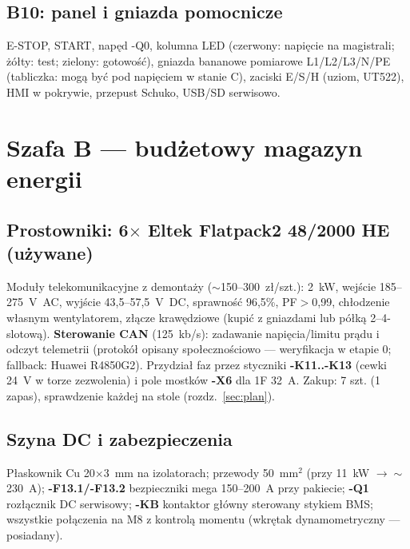 \documentclass[11pt,a4paper]{article}
\begin{document}
\subsection{B10: panel i gniazda pomocnicze}
E-STOP, START, napęd -Q0, kolumna LED (czerwony: napięcie na magistrali; żółty: test; zielony:
gotowość), gniazda bananowe pomiarowe L1/L2/L3/N/PE (tabliczka: mogą być pod napięciem w stanie C),
zaciski E/S/H (uziom, UT522), HMI w pokrywie, przepust Schuko, USB/SD serwisowo.

\section{Szafa B --- budżetowy magazyn energii}
\subsection{Prostowniki: 6$\times$ Eltek Flatpack2 48/2000 HE (używane)}
Moduły telekomunikacyjne z demontaży ($\sim$150--300~zł/szt.): 2~kW, wejście 185--275~V~AC,
wyjście 43,5--57,5~V~DC, sprawność 96,5\%, PF$>$0,99, chłodzenie własnym wentylatorem, złącze
krawędziowe (kupić z gniazdami lub półką 2--4-slotową). \textbf{Sterowanie CAN} (125~kb/s):
zadawanie napięcia/limitu prądu i odczyt telemetrii (protokół opisany społecznościowo ---
weryfikacja w etapie 0; fallback: Huawei R4850G2). Przydział faz przez styczniki \textbf{-K11..-K13}
(cewki 24~V w torze zezwolenia) i pole mostków \textbf{-X6} dla 1F 32~A. Zakup: 7 szt. (1 zapas),
sprawdzenie każdej na stole (rozdz.~\ref{sec:plan}).
\subsection{Szyna DC i zabezpieczenia}
Płaskownik Cu 20$\times$3~mm na izolatorach; przewody 50~mm$^2$ (przy 11~kW $\to\sim$230~A);
\textbf{-F13.1/-F13.2} bezpieczniki mega 150--200~A przy pakiecie; \textbf{-Q1} rozłącznik DC
serwisowy; \textbf{-KB} kontaktor główny sterowany stykiem BMS; wszystkie połączenia na M8
z kontrolą momentu (wkrętak dynamometryczny --- posiadany).
\end{document}
